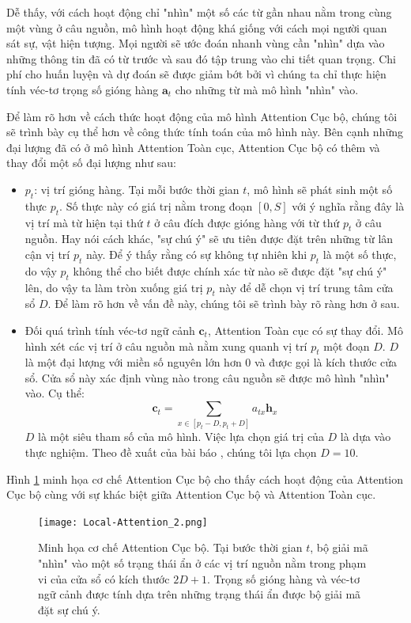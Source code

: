Dễ thấy, với cách hoạt động chỉ "nhìn" một số các từ gần nhau nằm trong cùng một vùng ở câu nguồn, mô hình hoạt động khá giống với cách mọi người quan sát sự, vật hiện tượng. Mọi người sẽ ước đoán nhanh vùng cần "nhìn" dựa vào những thông tin đã có từ trước và sau đó tập trung vào chi tiết quan trọng. Chi phí cho huấn luyện và dự đoán sẽ được giảm bớt bởi vì chúng ta chỉ thực hiện tính véc-tơ trọng số gióng hàng $\bm{a}_t$ cho những từ mà mô hình "nhìn" vào.

Để làm rõ hơn về cách thức hoạt động của mô hình Attention Cục bộ, chúng tôi sẽ trình bày cụ thể hơn về công thức tính toán của mô hình này. Bên cạnh những đại lượng đã có ở mô hình Attention Toàn cục, Attention Cục bộ có thêm và thay đổi một số đại lượng như sau:
\begin{itemize}
	\item $p_t$: vị trí gióng hàng. Tại mỗi bước thời gian $t$, mô hình sẽ phát sinh một số thực $p_t$. Số thực này có giá trị nằm trong đoạn $[0, S]$ với ý nghĩa rằng đây là vị trí mà từ hiện tại thứ $t$ ở câu đích được gióng hàng với từ thứ $p_t$ ở câu nguồn. Hay nói cách khác, "sự chú ý" sẽ ưu tiên được đặt trên những từ lân cận vị trí $p_t$ này. Để ý thấy rằng có sự không tự nhiên khi $p_t$ là một số thực, do vậy $p_t$ không thể cho biết được chính xác từ nào sẽ được đặt "sự chú ý" lên, do vậy ta làm tròn xuống giá trị $p_t$ này để dễ chọn vị trí trung tâm cửa sổ $D$. Để làm rõ hơn về vấn đề này, chúng tôi sẽ trình bày rõ ràng hơn ở sau.
	\item Đối quá trình tính véc-tơ ngữ cảnh $\bm{c}_t$, Attention Toàn cục có sự thay đổi. Mô hình xét các vị trí ở câu nguồn mà nằm xung quanh vị trí $p_t$ một đoạn $D$. $D$ là một đại lượng với miền số nguyên lớn hơn 0 và được gọi là kích thước cửa sổ. Cửa sổ này xác định vùng nào trong câu nguồn sẽ được mô hình "nhìn" vào. Cụ thể:
	\begin{equation}
	\bm{c}_t = \sum_{x \in [p_t - D, p_t + D]} a_{tx} \bm{h}_x
	\end{equation}
	$D$ là một siêu tham số của mô hình. Việc lựa chọn giá trị của $D$ là dựa vào thực nghiệm. Theo đề xuất của bài báo \cite{attentionThangLuong2015}, chúng tôi lựa chọn $D = 10$.
\end{itemize}

Hình \ref{fig_Local_Attention} minh họa cơ chế Attention Cục bộ cho thấy cách hoạt động của Attention Cục bộ cùng với sự khác biệt giữa Attention Cục bộ và Attention Toàn cục.

\begin{figure}
	\centering
	\texttt{[image: Local-Attention\_2.png]}
	\caption[Minh họa cơ chế Attention Cục bộ.]{Minh họa cơ chế Attention Cục bộ. Tại bước thời gian $t$, bộ giải mã "nhìn" vào một số trạng thái ẩn ở các vị trí nguồn nằm trong phạm vi của cửa sổ có kích thước $2D + 1$. Trọng số gióng hàng và véc-tơ ngữ cảnh được tính dựa trên những trạng thái ẩn được bộ giải mã đặt sự chú ý.}
	\label{fig_Local_Attention}
\end{figure}

